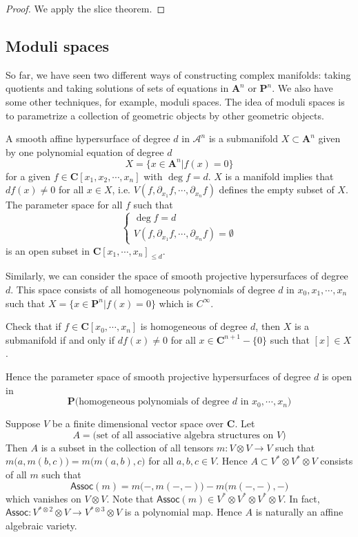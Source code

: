 \documentclass[
11pt, %
letterpaper， %
oneside, %
headinclude,footinclude, %
BCOR5mm, %
]{scrartcl}
\newcommand{\C}{{\mathbf{C}}}
\newcommand{\cp}{{\mathbf{P}}}
\newcommand{\A}{{\mathbf{A}}}
\newcommand{\ass}{\mathsf{Assoc}}
\begin{document}
\begin{proof}
	We apply the slice theorem.
\end{proof}
\subsection{Moduli spaces	}
So far, we have seen two different ways of constructing complex manifolds: taking quotients and taking solutions of sets of equations in $\A^n$ or $\cp^n$. We also have some other techniques, for example, moduli spaces. The idea of moduli spaces is to parametrize a  collection of  geometric  objects by other geometric objects.

\begin{ex}
	A smooth affine hypersurface of degree $d$ in $\mathcal{A}^n$ is a submanifold $X\subset \A^n$ given by one polynomial equation of degree $d$
	\begin{equation*}
	X=\{x\in \A^n| f(x)=0\}
	\end{equation*}
	for a given $f\in \C[x_1,x_2,\cdots, x_n]$ with $\deg f=d$. $X$ is a manifold implies that $df(x)\not=0$ for all $x\in X$, i.e. $V(f, \partial_{x_1}f,\cdots, \partial_{x_n}f)$ defines the empty subset of $X$.  The parameter space for all $f$ such that
\begin{equation*}
	\begin{cases}
  \deg f=d\\
 V(f, \partial_{x_1}f,\cdots, \partial_{x_n}f)=\emptyset
\end{cases} 
\end{equation*}
is an open subset in $\C[x_1,\cdots, x_n]_{\le d}$.

Similarly, we can consider the space of smooth projective hypersurfaces of degree $d$. This space consists of all homogeneous polynomials of degree $d$ in $x_0, x_1, \cdots, x_n$ such that $X=\{x\in \cp^n| f(x)=0 \}$ which is $C^{\infty}$. 
\begin{exercise}
	Check that if $f\in \C[x_0,\cdots, x_n]$ is homogeneous of degree $d$, then $X$ is a submanifold if and only if $df(x)\not=0$ for all $x\in \C^{n+1}-\{0\}$ such that $[x]\in X$.
\end{exercise}
Hence the parameter space of smooth projective hypersurfaces of degree $d$ is open in $$\cp \big(\text{homogeneous polynomials of degree $d$ in $x_0,\cdots, x_n$} \big)$$ 
\end{ex}

\begin{ex}
	Suppose $V$ be a finite dimensional vector space over $\C$. Let $$A=\big(\text{set of all associative algebra structures on $V$} \big)$$ Then $A$ is a subset in the collection of all tensors $m: V\otimes V \to V$ such that $m\big(a, m(b,c) \big)=m\big(m(a,b),c \big)$ for all $a,b,c\in V$. Hence $A\subset V^*\otimes V^*\otimes V$ consists of all $m$ such that
	 $$\ass(m)=m\big(-,m(-,-)\big)-m\big(m(-,-),- \big)$$
	which vanishes on $V\otimes V$. Note that $\ass(m)\in V^*\otimes V^*\otimes V^*\otimes V$. In fact, $\ass: V^{*\otimes 2}\otimes V \to V^{*\otimes 3}\otimes V$ is a polynomial map. Hence $A$ is naturally an affine algebraic variety.
\end{ex}
\end{document}
